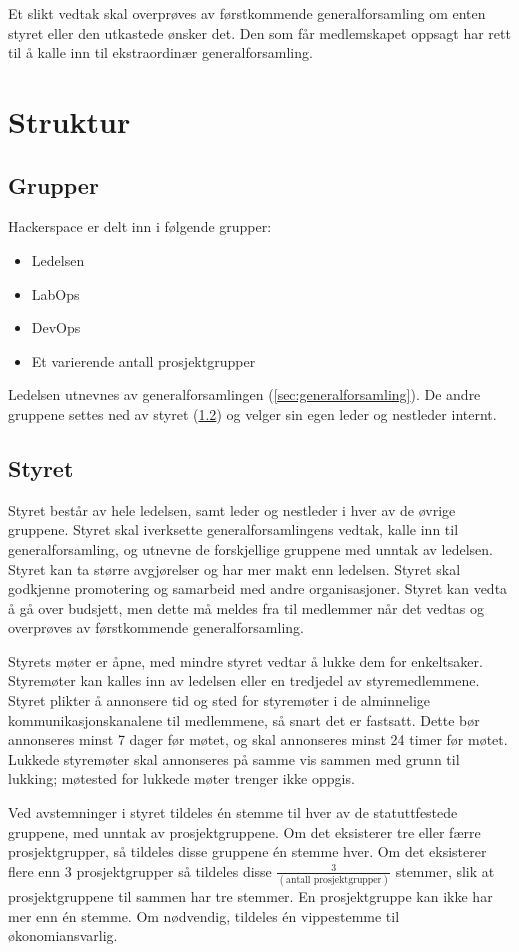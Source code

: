 Et slikt vedtak skal overprøves av førstkommende generalforsamling om enten styret eller den utkastede ønsker det. Den som får medlemskapet oppsagt har rett til å kalle inn til ekstraordinær generalforsamling.


\section{Struktur}\label{sec:struktur}
\subsection{Grupper}\label{sec:struktur:grupper}
Hackerspace er delt inn i følgende grupper:
\begin{itemize}
\item Ledelsen
\item LabOps
\item DevOps
\item Et varierende antall prosjektgrupper
\end{itemize}
Ledelsen utnevnes av generalforsamlingen (\ref{sec:generalforsamling}). De andre gruppene settes ned av styret (\ref{sec:struktur:styret}) og velger sin egen leder og nestleder internt.

\subsection{Styret}\label{sec:struktur:styret}
Styret består av hele ledelsen, samt leder og nestleder i hver av de øvrige gruppene.
Styret skal iverksette generalforsamlingens vedtak, kalle inn til generalforsamling, og utnevne de forskjellige gruppene med unntak av ledelsen.
Styret kan ta større avgjørelser og har mer makt enn ledelsen.
Styret skal godkjenne promotering og samarbeid med andre organisasjoner.
Styret kan vedta å gå over budsjett, men dette må meldes fra til medlemmer når det vedtas og overprøves av førstkommende generalforsamling.

Styrets møter er åpne, med mindre styret vedtar å lukke dem for enkeltsaker.
Styremøter kan kalles inn av ledelsen eller en tredjedel av styremedlemmene.
Styret plikter å annonsere tid og sted for styremøter i de alminnelige kommunikasjonskanalene til medlemmene, så snart det er fastsatt.
Dette bør annonseres minst 7 dager før møtet, og skal annonseres minst 24 timer før møtet.
Lukkede styremøter skal annonseres på samme vis sammen med grunn til lukking; møtested for lukkede møter trenger ikke oppgis.

Ved avstemninger i styret tildeles én stemme til hver av de statuttfestede gruppene, med unntak av prosjektgruppene. 
Om det eksisterer tre eller færre prosjektgrupper, så tildeles disse gruppene én stemme hver. Om det eksisterer flere enn 3 prosjektgrupper så tildeles disse $\frac{3}{(\text{antall prosjektgrupper})}$ stemmer, slik at prosjektgruppene til sammen har tre stemmer. En prosjektgruppe kan ikke har mer enn én stemme.
Om nødvendig, tildeles én vippestemme til økonomiansvarlig.

